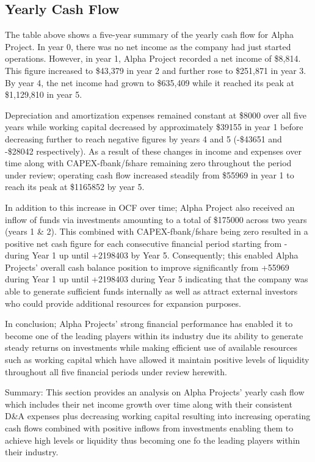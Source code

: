 

\subsection{Yearly Cash Flow}\label{sec:cashflow}

The table above shows a five-year summary of the yearly cash flow for Alpha Project. In year 0, there was no net income as the company had just started operations. However, in year 1, Alpha Project recorded a net income of \$8,814. This figure increased to \$43,379 in year 2 and further rose to \$251,871 in year 3. By year 4, the net income had grown to \$635,409 while it reached its peak at \$1,129,810 in year 5. 

Depreciation and amortization expenses remained constant at \$8000 over all five years while working capital decreased by approximately \$39155 in year 1 before decreasing further to reach negative figures by years 4 and 5 (-\$43651 and -\$28042 respectively). As a result of these changes in income and expenses over time along with CAPEX-fbank/fshare remaining zero throughout the period under review; operating cash flow increased steadily from \$55969 in year 1 to reach its peak at \$1165852 by year 5. 

In addition to this increase in OCF over time; Alpha Project also received an inflow of funds via investments amounting to a total of \$175000 across two years (years 1 & 2). This combined with CAPEX-fbank/fshare being zero resulted in a positive net cash figure for each consecutive financial period starting from - during Year 1 up until +2198403 by Year 5. Consequently; this enabled Alpha Projects' overall cash balance position to improve significantly from +55969 during Year 1 up until +2198403 during Year 5 indicating that the company was able to generate sufficient funds internally as well as attract external investors who could provide additional resources for expansion purposes. 

In conclusion; Alpha Projects' strong financial performance has enabled it to become one of the leading players within its industry due its ability to generate steady returns on investments while making efficient use of available resources such as working capital which have allowed it maintain positive levels of liquidity throughout all five financial periods under review herewith. 

Summary: This section provides an analysis on Alpha Projects' yearly cash flow which includes their net income growth over time along with their consistent D&A expenses plus decreasing working capital resulting into increasing operating cash flows combined with positive inflows from investments enabling them to achieve high levels or liquidity thus becoming one fo the leading players within their industry.
